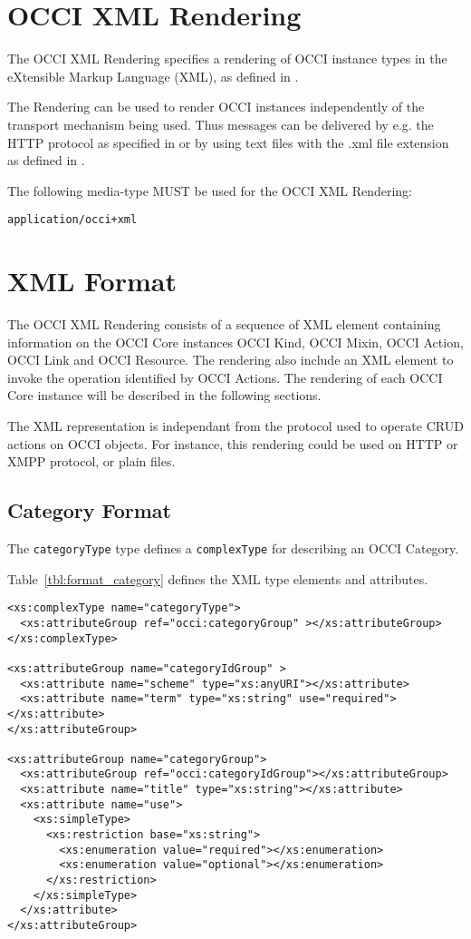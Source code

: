 \documentclass[10pt,a4paper]{article}
\begin{document}
\section{OCCI XML Rendering}

The OCCI XML Rendering specifies a rendering of OCCI instance types in
the eXtensible Markup Language (XML), as defined in \cite{w3c:xml11}.

The Rendering can be used to render OCCI instances independently of the
transport mechanism being used. Thus messages can be delivered by e.g. the HTTP
protocol as specified in \cite{occi:http_rendering} or by using text files with
the .xml file extension as defined in \cite{w3c:xml11}.

The following media-type MUST be used for the OCCI XML Rendering:

{\tt application/occi+xml}

\section{XML Format}
\label{sec:xml_format}

The OCCI XML Rendering consists of a sequence of XML element containing
information on the OCCI Core instances OCCI Kind, OCCI Mixin, OCCI
Action, OCCI Link and OCCI Resource. The rendering also include an XML
element to invoke the operation identified by OCCI Actions.
The rendering of each OCCI Core instance will be described in the
following sections.

The XML representation is independant from the protocol used to
operate CRUD actions on OCCI objects. For instance, this rendering
could be used on HTTP or XMPP protocol, or plain files.

\subsection{Category Format}
\label{sec:format_category}

The \texttt{categoryType} type defines a \texttt{complexType} for
describing an OCCI Category. 

Table~\ref{tbl:format_category} defines the XML type elements and
attributes.

\begin{lstlisting}
<xs:complexType name="categoryType">	
  <xs:attributeGroup ref="occi:categoryGroup" ></xs:attributeGroup>
</xs:complexType>

<xs:attributeGroup name="categoryIdGroup" >
  <xs:attribute name="scheme" type="xs:anyURI"></xs:attribute>
  <xs:attribute name="term" type="xs:string" use="required"></xs:attribute>
</xs:attributeGroup>

<xs:attributeGroup name="categoryGroup">	
  <xs:attributeGroup ref="occi:categoryIdGroup"></xs:attributeGroup>
  <xs:attribute name="title" type="xs:string"></xs:attribute>
  <xs:attribute name="use">
    <xs:simpleType>
      <xs:restriction base="xs:string">
        <xs:enumeration value="required"></xs:enumeration>
        <xs:enumeration value="optional"></xs:enumeration>
      </xs:restriction>
    </xs:simpleType>
  </xs:attribute>
</xs:attributeGroup>
\end{lstlisting}
\end{document}

